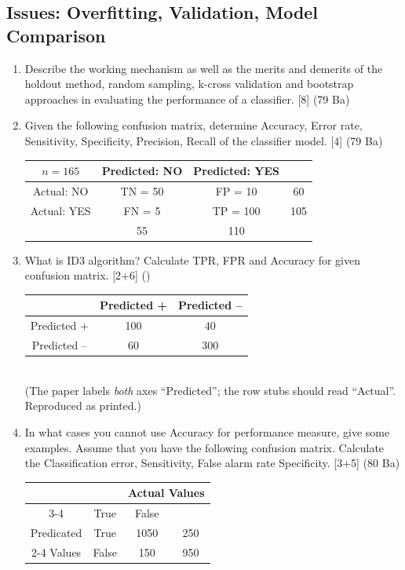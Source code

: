 \documentclass[12pt]{article}
\begin{document}
  \subsection{Issues: Overfitting, Validation, Model Comparison}
    \begin{enumerate}[topsep=0pt, noitemsep]
      \item Describe the working mechanism as well as the merits and demerits of the holdout method, random sampling, k-cross validation and bootstrap approaches in evaluating the performance of a classifier. \hfill [8] (79 Ba)

      \item Given the following confusion matrix, determine Accuracy, Error rate, Sensitivity, Specificity, Precision, Recall of the classifier model. \hfill [4] (79 Ba)\\
        \small
        \begin{tabular}{|c|c|c|c|}
          \hline
          $n = 165$ & Predicted: NO & Predicted: YES & \\ \hline
          Actual: NO & TN = 50 & FP = 10 & 60 \\ \hline
          Actual: YES & FN = 5 & TP = 100 & 105 \\ \hline
           & 55 & 110 & \\ \hline
        \end{tabular}
        \normalsize

      \item What is ID3 algorithm? Calculate TPR, FPR and Accuracy for given confusion matrix. \hfill [2+6] ()\\
        \small
        \begin{tabular}{|c|c|c|}
          \hline
           & Predicted + & Predicted -- \\ \hline
          Predicted + & 100 & 40 \\ \hline
          Predicted -- & 60 & 300 \\ \hline
        \end{tabular}
        \normalsize\\
        (The paper labels \emph{both} axes ``Predicted''; the row stubs should read ``Actual''. Reproduced as printed.)

      \item In what cases you cannot use Accuracy for performance measure, give some examples. Assume that you have the following confusion matrix. Calculate the Classification error, Sensitivity, False alarm rate Specificity. \hfill [3+5] (80 Ba)\\
        \small
        \begin{tabular}{|c|c|c|c|}
          \hline
          \multicolumn{2}{|c|}{} & \multicolumn{2}{c|}{Actual Values} \\ \cline{3-4}
          \multicolumn{2}{|c|}{} & True & False \\ \hline
          Predicated & True & 1050 & 250 \\ \cline{2-4}
          Values & False & 150 & 950 \\ \hline
        \end{tabular}
        \normalsize


\end{enumerate}
\end{document}
